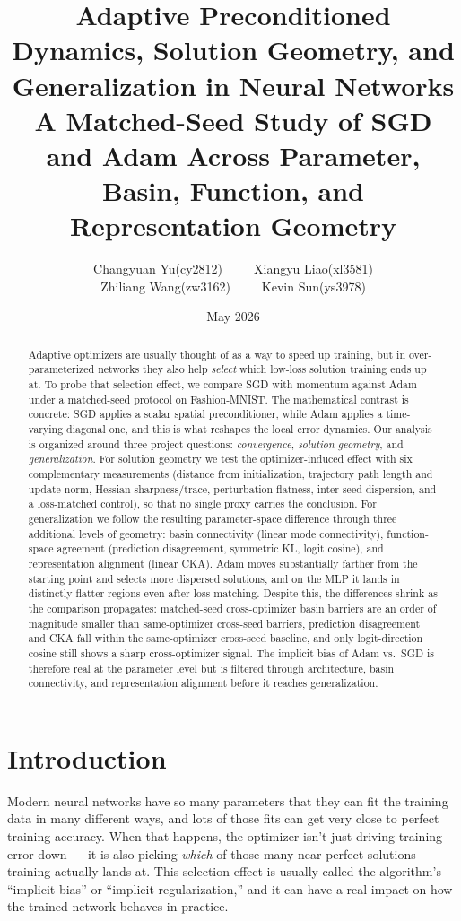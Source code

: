 \documentclass[11pt]{article}
\title{\textbf{Adaptive Preconditioned Dynamics, Solution Geometry, and Generalization in Neural Networks}\\
\Large A Matched-Seed Study of SGD and Adam Across Parameter, Basin, Function, and Representation Geometry}
\author{Changyuan Yu(cy2812)~~~~~Xiangyu Liao(xl3581)\\Zhiliang Wang(zw3162)~~~~~Kevin Sun(ys3978)}
\date{May 2026}
\begin{document}
\maketitle

\begin{abstract}
Adaptive optimizers are usually thought of as a way to speed up training, but in over-parameterized networks they also help \emph{select} which low-loss solution training ends up at. To probe that selection effect, we compare SGD with momentum against Adam under a matched-seed protocol on Fashion-MNIST. The mathematical contrast is concrete: SGD applies a scalar spatial preconditioner, while Adam applies a time-varying diagonal one, and this is what reshapes the local error dynamics. Our analysis is organized around three project questions: \emph{convergence}, \emph{solution geometry}, and \emph{generalization}. For solution geometry we test the optimizer-induced effect with six complementary measurements (distance from initialization, trajectory path length and update norm, Hessian sharpness/trace, perturbation flatness, inter-seed dispersion, and a loss-matched control), so that no single proxy carries the conclusion. For generalization we follow the resulting parameter-space difference through three additional levels of geometry: basin connectivity (linear mode connectivity), function-space agreement (prediction disagreement, symmetric KL, logit cosine), and representation alignment (linear CKA). Adam moves substantially farther from the starting point and selects more dispersed solutions, and on the MLP it lands in distinctly flatter regions even after loss matching. Despite this, the differences shrink as the comparison propagates: matched-seed cross-optimizer basin barriers are an order of magnitude smaller than same-optimizer cross-seed barriers, prediction disagreement and CKA fall within the same-optimizer cross-seed baseline, and only logit-direction cosine still shows a sharp cross-optimizer signal. The implicit bias of Adam vs.\ SGD is therefore real at the parameter level but is filtered through architecture, basin connectivity, and representation alignment before it reaches generalization.
\end{abstract}

\section{Introduction}

Modern neural networks have so many parameters that they can fit the training data in many different ways, and lots of those fits can get very close to perfect training accuracy. When that happens, the optimizer isn't just driving training error down --- it is also picking \emph{which} of those many near-perfect solutions training actually lands at. This selection effect is usually called the algorithm's ``implicit bias'' or ``implicit regularization,'' and it can have a real impact on how the trained network behaves in practice.
\end{document}
